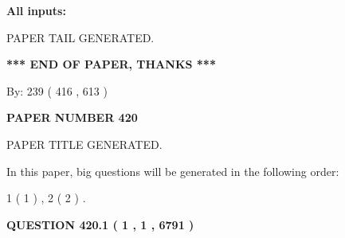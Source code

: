 \documentclass[12pt]{article}
\begin{document}
   
   
   
\noindent{}
   
   
   
   
\noindent\vspace{0.1in}\hspace{-0.08in} {\textbf{\Large{All inputs: }}}
   
   
   
   
   
   
 \vspace{0.2in}
 
   
   
\vspace{2.0in} PAPER TAIL GENERATED.
   
   
   
   
\vspace{1.0in} 
{\textbf{\large{ *** END OF PAPER, THANKS *** }}} 
   
   
\hspace{1.0in} By: 
 239 ( 416 ,  613 )
   
   
   
   
\newpage 
\setcounter{page}{ 
   420001 } 
   
   
   
   
 {\textbf{ \Large{ PAPER NUMBER  420  }}}
   
   
\vspace{0.2in}
   
   
   
   
   
   
   
   
 \vspace{0.2in}
 
 
 
 
   
   
 PAPER TITLE GENERATED.
   
   
   
\vspace{0.2in}
   
In this paper, big questions will be generated in the following order: 
   
   
   1 ( 1 )
 ,
   2 ( 2 )
 .
  
\vspace{0.2in}
  
{\textbf{\Large{QUESTION
420.1 
 ( 1 , 1 , 6791 )
}}}
  
\end{document}

